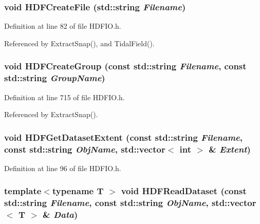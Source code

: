 \subsubsection[{HDFCreateFile}]{\setlength{\rightskip}{0pt plus 5cm}void HDFCreateFile (std::string {\em Filename})}\label{HDFIO_8h_aa4eeddaee70eb3ce64662c7d5a0e3687}


Definition at line 82 of file HDFIO.h.



Referenced by ExtractSnap(), and TidalField().

\subsubsection[{HDFCreateGroup}]{\setlength{\rightskip}{0pt plus 5cm}void HDFCreateGroup (const std::string {\em Filename}, \/  const std::string {\em GroupName})}\label{HDFIO_8h_adfafd5685316cd050ad282b7837e7f05}


Definition at line 715 of file HDFIO.h.



Referenced by ExtractSnap().

\subsubsection[{HDFGetDatasetExtent}]{\setlength{\rightskip}{0pt plus 5cm}void HDFGetDatasetExtent (const std::string {\em Filename}, \/  const std::string {\em ObjName}, \/  std::vector$<$ int $>$ \& {\em Extent})}\label{HDFIO_8h_a285070bd55644602c9a8ac1830d44c39}


Definition at line 96 of file HDFIO.h.

\subsubsection[{HDFReadDataset}]{\setlength{\rightskip}{0pt plus 5cm}template$<$typename T $>$ void HDFReadDataset (const std::string {\em Filename}, \/  const std::string {\em ObjName}, \/  std::vector$<$ T $>$ \& {\em Data})}\label{HDFIO_8h_aa9021278db454aa0b55e9d45db4d1732}


